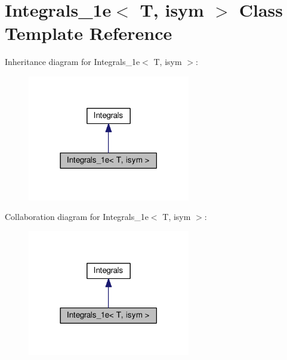 \hypertarget{classIntegrals__1e}{}\section{Integrals\+\_\+1e$<$ T, isym $>$ Class Template Reference}
\label{classIntegrals__1e}


Inheritance diagram for Integrals\+\_\+1e$<$ T, isym $>$\+:
\nopagebreak
\begin{figure}[H]
\begin{center}
\leavevmode
\includegraphics[width=201pt]{classIntegrals__1e__inherit__graph}
\end{center}
\end{figure}


Collaboration diagram for Integrals\+\_\+1e$<$ T, isym $>$\+:
\nopagebreak
\begin{figure}[H]
\begin{center}
\leavevmode
\includegraphics[width=201pt]{classIntegrals__1e__coll__graph}
\end{center}
\end{figure}
